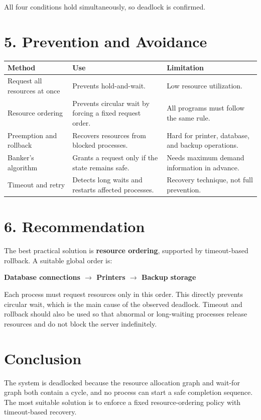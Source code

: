 \documentclass[12pt,a4paper]{article}
\begin{document}
All four conditions hold simultaneously, so deadlock is confirmed.

\section*{5. Prevention and Avoidance}

\begin{center}
\begin{tabular}{L{3.5cm} L{5.2cm} L{5.2cm}}
\toprule
\textbf{Method} & \textbf{Use} & \textbf{Limitation} \\
\midrule
Request all resources at once & Prevents hold-and-wait. & Low resource utilization. \\
Resource ordering & Prevents circular wait by forcing a fixed request order. & All programs must follow the same rule. \\
Preemption and rollback & Recovers resources from blocked processes. & Hard for printer, database, and backup operations. \\
Banker's algorithm & Grants a request only if the state remains safe. & Needs maximum demand information in advance. \\
Timeout and retry & Detects long waits and restarts affected processes. & Recovery technique, not full prevention. \\
\bottomrule
\end{tabular}
\end{center}

\section*{6. Recommendation}

The best practical solution is \textbf{resource ordering}, supported by timeout-based rollback. A suitable global order is:

\begin{center}
\textbf{Database connections $\rightarrow$ Printers $\rightarrow$ Backup storage}
\end{center}

Each process must request resources only in this order. This directly prevents circular wait, which is the main cause of the observed deadlock. Timeout and rollback should also be used so that abnormal or long-waiting processes release resources and do not block the server indefinitely.

\section*{Conclusion}

The system is deadlocked because the resource allocation graph and wait-for graph both contain a cycle, and no process can start a safe completion sequence. The most suitable solution is to enforce a fixed resource-ordering policy with timeout-based recovery.
\end{document}
